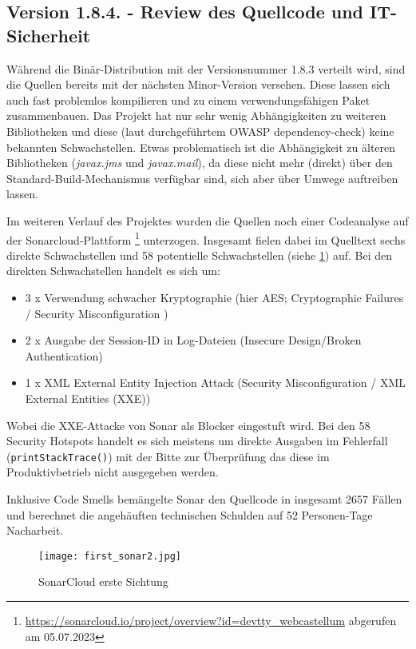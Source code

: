 \subsection{Version 1.8.4. - Review des Quellcode und IT-Sicherheit}
Während die Binär-Distribution mit der Versionsnummer 1.8.3 verteilt wird, sind die Quellen bereits mit der nächsten Minor-Version versehen. Diese lassen sich auch fast problemlos kompilieren und zu einem verwendungsfähigen Paket zusammenbauen. Das Projekt hat nur sehr wenig Abhängigkeiten zu weiteren Bibliotheken und diese (laut durchgeführtem OWASP dependency-check) keine bekannten Schwachstellen. Etwas problematisch ist die Abhängigkeit zu älteren Bibliotheken (\emph{javax.jms} und \emph{javax.mail}), da diese nicht mehr (direkt) über den Standard-Build-Mechanismus verfügbar sind, sich aber über Umwege auftreiben lassen.

Im weiteren Verlauf des Projektes wurden die Quellen noch einer Codeanalyse auf der Sonarcloud-Plattform \footnote{\url{https://sonarcloud.io/project/overview?id=devtty_webcastellum} abgerufen am 05.07.2023} unterzogen. Insgesamt fielen dabei im Quelltext sechs direkte Schwachstellen und 58 potentielle Schwachstellen (siehe \ref{fig:my_sonar1}) auf. Bei den direkten Schwachstellen handelt es sich um:

\begin{itemize}
    \item 3 x Verwendung schwacher Kryptographie (hier AES; Cryptographic Failures / Security Misconfiguration )
    \item 2 x Ausgabe der Session-ID in Log-Dateien (Insecure Design/Broken Authentication)
    \item 1 x XML External Entity Injection Attack (Security Misconfiguration / XML External Entities (XXE))
\end{itemize}

Wobei die XXE-Attacke von Sonar als Blocker eingestuft wird. Bei den 58 Security Hotspots handelt es sich meistens um direkte Ausgaben im Fehlerfall (\verb=printStackTrace()=) mit der Bitte zur Überprüfung das diese im Produktivbetrieb nicht ausgegeben werden. 

Inklusive Code Smells bemängelte Sonar den Quellcode in insgesamt 2657 Fällen und berechnet die angehäuften technischen Schulden auf 52 Personen-Tage Nacharbeit. 

\begin{figure}
    \centering
    \texttt{[image: first\_sonar2.jpg]}
    \caption{SonarCloud erste Sichtung}
    \label{fig:my_sonar1}
\end{figure}

